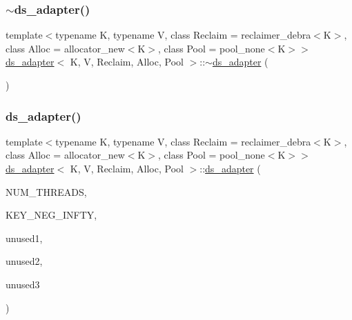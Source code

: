 \mbox{\label{classds__adapter_a366f46dd39d59f2d4a147589f5fd98e3}} 
\subsubsection{\texorpdfstring{$\sim$ds\+\_\+adapter()}{~ds\_adapter()}\hspace{0.1cm}{\footnotesize\ttfamily [6/26]}}
{\footnotesize\ttfamily template$<$typename K, typename V, class Reclaim = reclaimer\+\_\+debra$<$\+K$>$, class Alloc = allocator\+\_\+new$<$\+K$>$, class Pool = pool\+\_\+none$<$\+K$>$$>$ \\
\hyperlink{classds__adapter}{ds\+\_\+adapter}$<$ K, V, Reclaim, Alloc, Pool $>$\+::$\sim$\hyperlink{classds__adapter}{ds\+\_\+adapter} (\begin{DoxyParamCaption}{ }\end{DoxyParamCaption})\hspace{0.3cm}{\ttfamily [inline]}}

\mbox{\label{classds__adapter_a75376588d423be0fe462aa38b2fe7516}} 
\subsubsection{\texorpdfstring{ds\+\_\+adapter()}{ds\_adapter()}\hspace{0.1cm}{\footnotesize\ttfamily [7/27]}}
{\footnotesize\ttfamily template$<$typename K, typename V, class Reclaim = reclaimer\+\_\+debra$<$\+K$>$, class Alloc = allocator\+\_\+new$<$\+K$>$, class Pool = pool\+\_\+none$<$\+K$>$$>$ \\
\hyperlink{classds__adapter}{ds\+\_\+adapter}$<$ K, V, Reclaim, Alloc, Pool $>$\+::\hyperlink{classds__adapter}{ds\+\_\+adapter} (\begin{DoxyParamCaption}\item[{const int}]{N\+U\+M\+\_\+\+T\+H\+R\+E\+A\+DS,  }\item[{const K \&}]{K\+E\+Y\+\_\+\+N\+E\+G\+\_\+\+I\+N\+F\+TY,  }\item[{const K \&}]{unused1,  }\item[{const V \&}]{unused2,  }\item[{\hyperlink{classRandomFNV1A}{Random\+F\+N\+V1A} $\ast$const}]{unused3 }\end{DoxyParamCaption})\hspace{0.3cm}{\ttfamily [inline]}}

